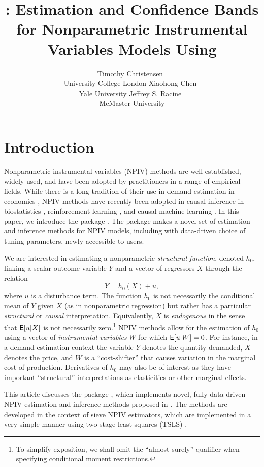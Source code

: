 \documentclass[
]{jss}
\author{
Timothy Christensen~\orcidlink{0000-0002-4639-5015}\\University College
London \And Xiaohong Chen~\orcidlink{0000-0003-1125-675X}\\Yale
University \And Jeffrey S.
Racine~\orcidlink{0000-0002-5680-3705}\\McMaster University
}
\title{\pkg{npiv}: Estimation and Confidence Bands for Nonparametric
Instrumental Variables Models Using \proglang{R}}
\begin{document}
\section{Introduction}\label{introduction}

Nonparametric instrumental variables (NPIV) methods are
well-established, widely used, and have been adopted by practitioners in
a range of empirical fields. While there is a long tradition of their
use in demand estimation in economics \citep{BCK, BHP, BerryHaile2014},
NPIV methods have recently been adopted in causal inference in
biostatistics \citep{WangZhiTT2018}, reinforcement learning
\citep{grettonRL2021}, and causal machine learning \citep{causalML}. In
this paper, we introduce the  package . The
package makes a novel set of estimation and inference methods for NPIV
models, including with data-driven choice of tuning parameters, newly
accessible to  users.

We are interested in estimating a nonparametric \emph{structural
function}, denoted \(h_0\), linking a scalar outcome variable \(Y\) and
a vector of regressors \(X\) through the relation
\begin{equation}\label{eq:npiv}
 Y = h_0(X) + u,
\end{equation} where \(u\) is a disturbance term. The function \(h_0\)
is not necessarily the conditional mean of \(Y\) given \(X\) (as in
nonparametric regression) but rather has a particular \emph{structural}
or \emph{causal} interpretation. Equivalently, \(X\) is
\emph{endogenous} in the sense that \(\mathsf{E}[u|X]\) is not necessarily
zero.\footnote{To simplify exposition, we shall omit the ``almost
  surely'' qualifier when specifying conditional moment restrictions.}
NPIV methods allow for the estimation of \(h_0\) using a vector of
\emph{instrumental variables} \(W\) for which \(\mathsf{E}[u|W] = 0\). For
instance, in a demand estimation context the variable \(Y\) denotes the
quantity demanded, \(X\) denotes the price, and \(W\) is a
``cost-shifter'' that causes variation in the marginal cost of
production. Derivatives of \(h_0\) may also be of interest as they have
important ``structural'' interpretations as elasticities or other
marginal effects.

This article discusses the  package , which
implements novel, fully data-driven NPIV estimation and inference
methods proposed in \citet{CCK}. The methods are developed in the
context of sieve NPIV estimators, which are implemented in a very simple
manner using two-stage least-squares (TSLS) \citep{AC, NP}.
\end{document}
